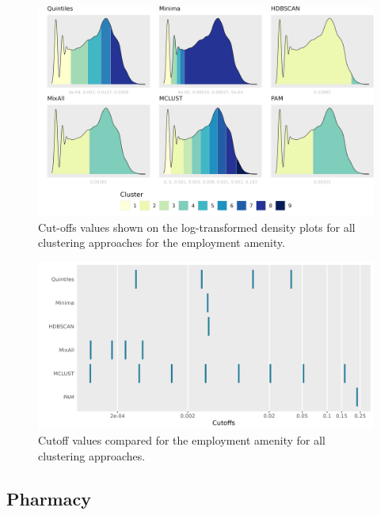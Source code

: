 \documentclass[11pt, a4paper]{article}
\begin{document}
\begin{figure}[H]
\centering
\includegraphics[width=\textwidth]{./cutoffs/by_amenity/Employment_cutoffs.png}
\caption[Employment cutoffs]{Cut-offs values shown on the log-transformed density plots for all clustering approaches for the employment amenity.}\label{employmentcutoffs}
\end{figure}



\begin{figure}[H]
\centering
\includegraphics[width=\textwidth]{./cutoff_ticks/Employment_ticks.png}
\caption[Employment cutoff comparison]{Cutoff values compared for the employment amenity for all clustering approaches.}\label{employmentticks}
\end{figure}









\justifying
\subsection{Pharmacy}
\end{document}
